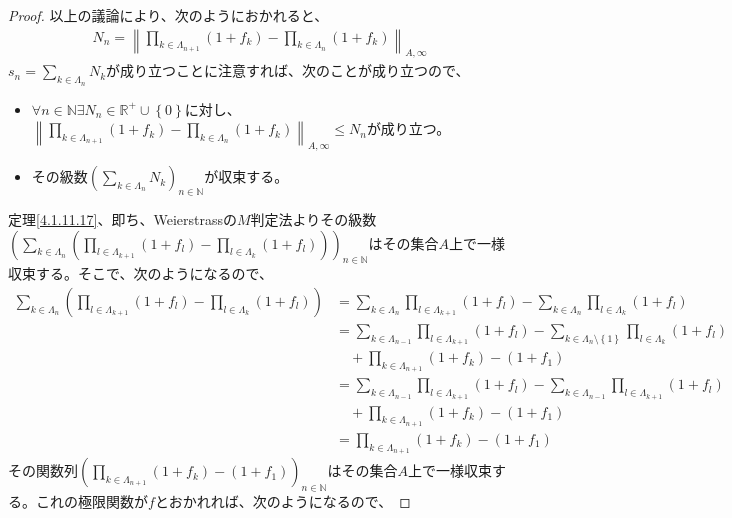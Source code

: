 \documentclass[dvipdfmx]{jsarticle}
\begin{document}
\begin{proof}
以上の議論により、次のようにおかれると、
\begin{align*}
N_{n} = \left\| \prod_{k \in \varLambda_{n + 1}} \left( 1 + f_{k} \right) - \prod_{k \in \varLambda_{n}} \left( 1 + f_{k} \right) \right\|_{A,\infty}
\end{align*}
$s_{n} = \sum_{k \in \varLambda_{n}} N_{k}$が成り立つことに注意すれば、次のことが成り立つので、
\begin{itemize}
\item
  $\forall n \in \mathbb{N}\exists N_{n} \in \mathbb{R}^{+} \cup \left\{ 0 \right\}$に対し、$\left\| \prod_{k \in \varLambda_{n + 1}} \left( 1 + f_{k} \right) - \prod_{k \in \varLambda_{n}} \left( 1 + f_{k} \right) \right\|_{A,\infty} \leq N_{n}$が成り立つ。
\item
  その級数$\left( \sum_{k \in \varLambda_{n}} N_{k} \right)_{n \in \mathbb{N}}$が収束する。
\end{itemize}
定理\ref{4.1.11.17}、即ち、Weierstrassの$M$判定法よりその級数$\left( \sum_{k \in \varLambda_{n}} \left( \prod_{l \in \varLambda_{k + 1}} \left( 1 + f_{l} \right) - \prod_{l \in \varLambda_{k}} \left( 1 + f_{l} \right) \right) \right)_{n \in \mathbb{N}}$はその集合$A$上で一様収束する。そこで、次のようになるので、
\begin{align*}
\sum_{k \in \varLambda_{n}} \left( \prod_{l \in \varLambda_{k + 1}} \left( 1 + f_{l} \right) - \prod_{l \in \varLambda_{k}} \left( 1 + f_{l} \right) \right) &= \sum_{k \in \varLambda_{n}} {\prod_{l \in \varLambda_{k + 1}} \left( 1 + f_{l} \right)} - \sum_{k \in \varLambda_{n}} {\prod_{l \in \varLambda_{k}} \left( 1 + f_{l} \right)}\\
&= \sum_{k \in \varLambda_{n - 1}} {\prod_{l \in \varLambda_{k + 1}} \left( 1 + f_{l} \right)} - \sum_{k \in \varLambda_{n} \setminus \left\{ 1 \right\}} {\prod_{l \in \varLambda_{k}} \left( 1 + f_{l} \right)} \\
&\quad + \prod_{k \in \varLambda_{n + 1}} \left( 1 + f_{k} \right) - \left( 1 + f_{1} \right)\\
&= \sum_{k \in \varLambda_{n - 1}} {\prod_{l \in \varLambda_{k + 1}} \left( 1 + f_{l} \right)} - \sum_{k \in \varLambda_{n - 1}} {\prod_{l \in \varLambda_{k + 1}} \left( 1 + f_{l} \right)} \\
&\quad + \prod_{k \in \varLambda_{n + 1}} \left( 1 + f_{k} \right) - \left( 1 + f_{1} \right)\\
&= \prod_{k \in \varLambda_{n + 1}} \left( 1 + f_{k} \right) - \left( 1 + f_{1} \right)
\end{align*}
その関数列$\left( \prod_{k \in \varLambda_{n + 1}} \left( 1 + f_{k} \right) - \left( 1 + f_{1} \right) \right)_{n \in \mathbb{N}}$はその集合$A$上で一様収束する。これの極限関数が$f$とおかれれば、次のようになるので、

\end{proof}
\end{document}
